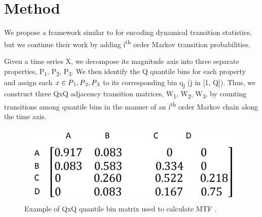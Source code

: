 \documentclass{turabian-thesis}
\begin{document}


\section{Method}

We propose a framework similar to \cite{wang_encoding_nodate}  for encoding dynamical transition statistics, but we continue their work by adding i\textsuperscript{th} order Markov transition probabilities.

Given a time series X, we decompose its magnitude axis into three separate properties, P\textsubscript{1},  P\textsubscript{2},  P\textsubscript{3}. We then identify the Q quantile bins for each property  and assign each $x \in P\textsubscript{1},  P\textsubscript{2},  P\textsubscript{3}$ to its corresponding bin q\textsubscript{j} (j in [1, Q]). Thus, we construct three QxQ adjacency transition matrices, W\textsubscript{1}, W\textsubscript{2}, W\textsubscript{3}, by counting transitions among quantile bins in the manner of an i\textsuperscript{th} order Markov chain along the time axis.

\begin{figure}[h!]
   \begin{center}
      \includegraphics[scale=0.6]{../media/mtf_q.png}
   \end{center}
   \caption{Example of QxQ quantile bin matrix used to calculate MTF \cite{wang_encoding_nodate}.}
   \label{fig:mtf_q}
\end{figure}
 
\end{document}
